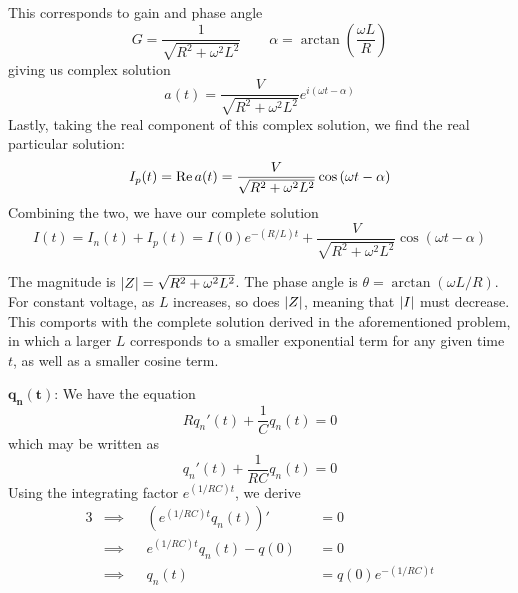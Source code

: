 \documentclass[a4paper]{article}
\begin{document}
This corresponds to gain and phase angle
\[
	G = \frac{1}{\sqrt{R^{2} + \omega^{2} L^{2}}} \qquad \alpha = \arctan \!\left( \frac{\omega L}{R} \right) 
\]
giving us complex solution
\[
	a \!\left( t \right) = \frac{V}{\sqrt{R^{2} + \omega^{2}L^{2}}}e^{i \!\left( \omega t - \alpha  \right) }
\]
Lastly, taking the real component of this complex solution, we find the real particular solution:
\[
	I_{p} \!\left( t \right) = \operatorname{Re} a \!\left( t \right) = \frac{V}{\sqrt{R^{2} + \omega^{2}L^{2}}} \cos\left( \omega t - \alpha  \right)
\]
Combining the two, we have our complete solution
\[
	I \!\left( t \right) = I_{n} \!\left( t \right) + I_{p} \!\left( t \right) = I \!\left( 0 \right) e^{-\!\left( R/L \right) t} + \frac{V}{\sqrt{R^{2} + \omega^{2}L^{2}}} \cos\left( \omega t - \alpha  \right)
\]


The magnitude is \(\abs{Z} = \sqrt{R^{2} + \omega^{2}L^{2}}\). The phase angle is \(\theta = \arctan \!\left( \omega L/R \right) \). For constant voltage, as \(L\) increases, so does \(\abs{Z}\), meaning that \(\abs{I}\)  must decrease. This comports with the complete solution derived in the aforementioned problem, in which a larger \(L\) corresponds to a smaller exponential term for any given time \(t\), as well as a smaller cosine term.

\vspace{12pt}


\(\bm{q_{n} \!\left( t \right) }\): We have the equation
\[
	R q_{n}' \!\left( t \right) + \frac{1}{C} q_{n} \!\left( t \right) = 0
\]
which may be written as
\[
	q_{n}' \!\left( t \right) + \frac{1}{RC} q_{n} \!\left( t \right) = 0
\]
Using the integrating factor \(e^{\!\left( 1/RC \right) t}\), we derive
\begin{alignat*}{3}
	&\implies && \!\left( e^{\!\left( 1/RC \right) t} q_{n} \!\left( t \right) \right)' && = 0  \\
	&\implies && e^{\!\left( 1/RC \right) t} q_{n} \!\left( t \right) - q \!\left( 0 \right) && = 0  \\
	&\implies && q_{n} \!\left( t \right) && = q \!\left( 0 \right)  e^{-\!\left( 1/RC \right) t}
\end{alignat*}
\end{document}
